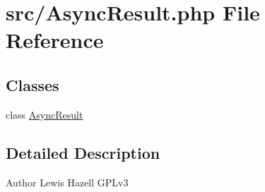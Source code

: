 \hypertarget{AsyncResult_8php}{\section{src/\-Async\-Result.php File Reference}
\label{AsyncResult_8php}
}
\subsection*{Classes}
\begin{DoxyCompactItemize}
\item 
class \hyperlink{classAsyncResult}{Async\-Result}
\end{DoxyCompactItemize}


\subsection{Detailed Description}
\begin{DoxyAuthor}{Author}
Lewis Hazell  G\-P\-Lv3 
\end{DoxyAuthor}
